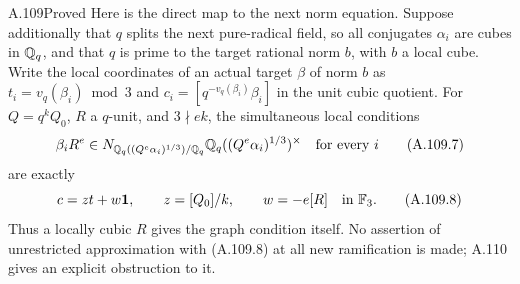 \begin{statement}{A.109}{Proved}
Here is the direct map to the next norm equation.  Suppose additionally
that $q$ splits the next pure-radical field, so all conjugates
$\alpha_i$ are cubes in $\mathbb Q_q$, and that $q$ is prime to the target
rational norm $b$, with $b$ a local cube.  Write the local coordinates
of an actual target $\beta$ of norm $b$ as
$t_i=v_q(\beta_i)\bmod3$ and
$c_i=[q^{-v_q(\beta_i)}\beta_i]$ in the unit cubic quotient.
For $Q=q^kQ_0$, $R$ a $q$-unit, and $3\nmid ek$, the simultaneous
local conditions
\[
 \beta_iR^e\in
 N_{\mathbb Q_q((Q^e\alpha_i)^{1/3})/\mathbb Q_q}
           \mathbb Q_q((Q^e\alpha_i)^{1/3})^\times
 \quad\text{for every }i
 \tag{A.109.7}
\]
are exactly
\[
 c=z t+w\mathbf1,\qquad
       z=[Q_0]/k,\qquad w=-e[R]\quad\text{in }\mathbb F_3.
 \tag{A.109.8}
\]
Thus a locally cubic $R$ gives the graph condition itself.
No assertion of unrestricted approximation with (A.109.8) at all
new ramification is made; A.110 gives an explicit obstruction to it.
\end{statement}

